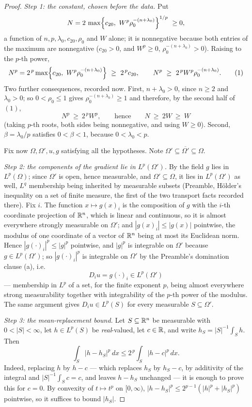 \begin{proof}
\emph{Step 1: the constant, chosen before the data.}  Put
\[
N=2\,\max\Bigl\{c_{20},\ W^p\rho_0^{-(n+\lambda_0)}\Bigr\}^{1/p}\ \ge0 ,
\]
a function of $n,p,\lambda_0,c_{20},\rho_0$ and $W$ alone; it is nonnegative
because both entries of the maximum are nonnegative ($c_{20}>0$, and
$W^p\ge0$, $\rho_0^{-(n+\lambda_0)}>0$).  Raising to the $p$-th power,
\[
N^p=2^{\,p}\max\Bigl\{c_{20},\ W^p\rho_0^{-(n+\lambda_0)}\Bigr\}
\ \ge\ 2^{\,p}c_{20},
\qquad
N^p\ \ge\ 2^{\,p}W^p\rho_0^{-(n+\lambda_0)} .
\tag{1}
\]
Two further consequences, recorded now.  First, $n+\lambda_0>0$, since $n\ge2$
and $\lambda_0>0$; so $0<\rho_0\le1$ gives $\rho_0^{-(n+\lambda_0)}\ge1$ and
therefore, by the second half of $(1)$,
\[
N^p\ \ge\ 2^{\,p}W^p,\qquad\text{hence}\qquad N\ \ge\ 2W\ \ge\ W
\tag{2}
\]
(taking $p$-th roots, both sides being nonnegative, and using $W\ge0$).
Second, $\beta=\lambda_0/p$ satisfies $0<\beta<1$, because $0<\lambda_0<p$.

Fix now $\Omega,\Omega',u,g$ satisfying all the hypotheses.  Note
$\Omega'\subseteq\overline{\Omega'}\subseteq\Omega$.

\emph{Step 2: the components of the gradient lie in $L^p(\Omega')$.}  By
 the field $g$ lies in $L^p(\Omega)$; since $\Omega'$ is open,
hence measurable, and $\Omega'\subseteq\Omega$, it lies in $L^p(\Omega')$ as
well, $L^q$ membership being inherited by measurable subsets (Preamble,
H\"older's inequality on a set of finite measure, the first of the two transport
facts recorded there).  Fix $i$.  The function $x\mapsto g(x)_i$ is the
composition of $g$ with the $i$-th coordinate projection of $\mathbb{R}^n$, which is
linear and continuous, so it is almost everywhere strongly measurable on
$\Omega'$; and $|g(x)_i|\le|g(x)|$ pointwise, the modulus of one coordinate of a
vector of $\mathbb{R}^n$ being at most its Euclidean norm.  Hence
$|g(\cdot)_i|^p\le|g|^p$ pointwise, and $|g|^p$ is integrable on $\Omega'$
because $g\in L^p(\Omega')$; so $|g(\cdot)_i|^p$ is integrable on $\Omega'$ by
the Preamble's domination clause (a), i.e.
\[
D_iu=g(\cdot)_i\in L^p(\Omega')
\tag{3}
\]
--- membership in $L^p$ of a set, for the finite exponent $p$, being almost
everywhere strong measurability together with integrability of the $p$-th power
of the modulus.  The same argument gives $D_iu\in L^p(S)$ for every measurable
$S\subseteq\Omega'$.

\emph{Step 3: the mean-replacement bound.}  Let $S\subseteq\mathbb{R}^n$ be measurable
with $0<|S|<\infty$, let $h\in L^p(S)$ be \emph{real}-valued, let $c\in\mathbb{R}$, and
write $h_S=|S|^{-1}\int_Sh$.  Then
\[
\int_S|h-h_S|^p\,dx\le2^{\,p}\int_S|h-c|^p\,dx .
\tag{M}
\]
Indeed, replacing $h$ by $h-c$ --- which replaces $h_S$ by $h_S-c$, by
additivity of the integral and $|S|^{-1}\int_Sc=c$, and leaves $h-h_S$
unchanged --- it is enough to prove this for $c=0$.  By convexity of
$t\mapsto t^p$ on $[0,\infty)$, $|h-h_S|^p\le2^{p-1}(|h|^p+|h_S|^p)$ pointwise,
so it suffices to bound $|h_S|$.


\end{proof}
